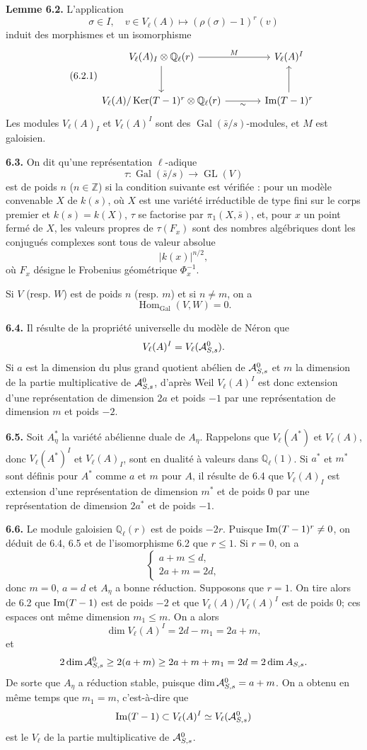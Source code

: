 \documentclass[11pt]{article}
\providecommand{\Gal}{\operatorname{Gal}}
\providecommand{\GL}{\operatorname{GL}}
\providecommand{\Ker}{\operatorname{Ker}}
\providecommand{\Ql}{\mathbb Q_\ell}
\providecommand{\Hom}{\operatorname{Hom}}
\begin{document}
\textbf{Lemme 6.2.} L'application
\[
 \sigma\in I,
 \quad v\in V_\ell(A)
 \longmapsto (\rho(\sigma)-1)^r(v)
\]
induit des morphismes et un isomorphisme
\begin{equation}\tag{6.2.1}
\begin{tikzcd}[column sep=large,row sep=large]
 V_\ell(A)_I\otimes\Ql(r) \arrow[r,"M"] \arrow[d]
 & V_\ell(A)^I \\
 V_\ell(A)/\Ker(T-1)^r\otimes\Ql(r) \arrow[r,"\sim"']
 & \Ima(T-1)^r \arrow[u]
\end{tikzcd}
\end{equation}
Les modules $V_\ell(A)_I$ et $V_\ell(A)^I$ sont des $\Gal(\bar s/s)$-modules, et $M$ est galoisien.

\textbf{6.3.} On dit qu'une représentation $\ell$-adique
\[
 \tau:\Gal(\bar s/s)\longrightarrow \GL(V)
\]
est de poids $n$ ($n\in\mathbb Z$) si la condition suivante est vérifiée : pour un modèle convenable $X$ de $k(s)$, où $X$ est une variété irréductible de type fini sur le corps premier et $k(s)=k(X)$, $\tau$ se factorise par $\pi_1(X,\bar s)$, et, pour $x$ un point fermé de $X$, les valeurs propres de $\tau(F_x)$ sont des nombres algébriques dont les conjugués complexes sont tous de valeur absolue
\[
 |k(x)|^{n/2},
\]
où $F_x$ désigne le Frobenius géométrique $\Phi_x^{-1}$.

Si $V$ (resp. $W$) est de poids $n$ (resp. $m$) et si $n\ne m$, on a
\[
 \Hom_{\Gal}(V,W)=0.
\]

\textbf{6.4.} Il résulte de la propriété universelle du modèle de Néron que
\[
 V_\ell(A)^I=V_\ell(\mathcal A^0_{S,s}).
\]
Si $a$ est la dimension du plus grand quotient abélien de $\mathcal A^0_{S,s}$ et $m$ la dimension de la partie multiplicative de $\mathcal A^0_{S,s}$, d'après Weil $V_\ell(A)^I$ est donc extension d'une représentation de dimension $2a$ et poids $-1$ par une représentation de dimension $m$ et poids $-2$.

\textbf{6.5.} Soit $A_\eta^*$ la variété abélienne duale de $A_\eta$. Rappelons que $V_\ell(A^*)$ et $V_\ell(A)$, donc $V_\ell(A^*)^I$ et $V_\ell(A)_I$, sont en dualité à valeurs dans $\Ql(1)$. Si $a^*$ et $m^*$ sont définis pour $A^*$ comme $a$ et $m$ pour $A$, il résulte de 6.4 que $V_\ell(A)_I$ est extension d'une représentation de dimension $m^*$ et de poids $0$ par une représentation de dimension $2a^*$ et de poids $-1$.

\textbf{6.6.} Le module galoisien $\Ql(r)$ est de poids $-2r$. Puisque $\operatorname{Im}(T-1)^r\ne0$, on déduit de 6.4, 6.5 et de l'isomorphisme 6.2 que $r\le1$. Si $r=0$, on a
\[
\begin{cases}
 a+m\le d,\\
 2a+m=2d,
\end{cases}
\]
donc $m=0$, $a=d$ et $A_\eta$ a bonne réduction. Supposons que $r=1$. On tire alors de 6.2 que $\operatorname{Im}(T-1)$ est de poids $-2$ et que $V_\ell(A)/V_\ell(A)^I$ est de poids $0$; ces espaces ont même dimension $m_1\le m$. On a alors
\[
 \dim V_\ell(A)^I=2d-m_1=2a+m,
\]
et
\[
 2\dim \mathcal A^0_{S,s}\ge 2(a+m)
 \ge 2a+m+m_1=2d=2\dim A_{S,s}.
\]
De sorte que $A_\eta$ a réduction stable, puisque $\dim \mathcal A^0_{S,s}=a+m$. On a obtenu en même temps que $m_1=m$, c'est-à-dire que
\[
 \operatorname{Im}(T-1)\subset V_\ell(A)^I\simeq V_\ell(\mathcal A^0_{S,s})
\]
est le $V_\ell$ de la partie multiplicative de $\mathcal A^0_{S,s}$.
\end{document}
